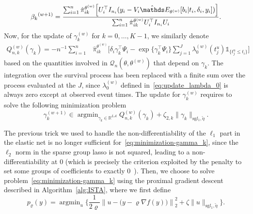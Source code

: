 \documentclass[11pt]{article}
\DeclareMathOperator{\argmin}{argmin}
\newcommand{\ind}[1]{\mathds{1}_{#1}}
\newcommand{\norm}[1]{\|#1\|}
\newcommand{\cA}{\mathcal A}
\newcommand{\cQ}{\mathcal Q}
\newcommand{\R}{\mathds R}
\newcommand{\E}{\mathds E}
\begin{document}
\begin{equation}
  \label{eq:update_beta}
  {\beta_k}^{(w+1)}= \dfrac{\sum_{i=1}^n\hat \pi_{ik}^{\theta^{(w)}} \Big[U_i^\top I_{n_i} (y_i - V_i\hat \E_{\theta^{(w)}}[ b_i | t_i, \delta_i, y_i])\Big]}{\sum_{i=1}^n \hat \pi_{ik}^{\theta^{(w)}} U_i^\top I_{n_i} U_i}.
\end{equation}
Now, for the update of $\gamma_k^{(w)}$ for $k=0, \ldots, K-1$, we similarly denote
\begin{align*}
  Q^{(w)}_{n,k}(\gamma_k) = -n^{-1} \sum_{i=1}^n &\hat\pi_{ik}^{\theta^{(w)}} \Big[\delta_i \gamma_k^\top \Psi_i -  \exp \big\{\gamma_k^\top \Psi_i\big\} \sum_{j=1}^J \lambda_0^{(w)}(t_j^u) \ind{\{t_j^u \leq t_i\}} \Big]
\end{align*}
based on the quantities involved in $\cQ_n(\theta, \theta^{(w)})$ that depend on $\gamma_k$. The integration over the survival process has been replaced with a finite sum over the process evaluated at the $J$, since $\lambda_0^{(w)}$ defined in~\eqref{eq:update_lambda_0} is always zero except at observed event times. The update for $\gamma_k^{(w)}$ requires to solve the following minimization problem
\begin{equation}
  \label{eq:minimization-gamma_k}
  \gamma_k^{(w+1)} \in \argmin_{\gamma_k \in \R^{L\cA}} Q^{(w)}_{n,k}(\gamma_k) + \zeta_{2,k} \norm{\gamma_k}_{\text{sg} l_1, \tilde{\eta}}.
\end{equation}

The previous trick we used to handle the non-differentiability of the $\ell_1$ part in the elastic net is no longer sufficient for~\eqref{eq:minimization-gamma_k}, since the $\ell_2$ norm in the sparse group lasso is not squared, leading to a non-differentiability at 0 (which is precisely the criterion exploited by the penalty to set some groups of coefficients to exactly 0~\citep{simon2013sparse}). Then, we choose to solve problem~\eqref{eq:minimization-gamma_k} using the proximal gradient descent~\citep{boyd2004convex} described in Algorithm~\ref{alg:ISTA}, where we first define
\[p_{\varrho}(y) = \argmin_u \Big\{\dfrac{1}{2\varrho} \left\lVert u - \big(y - \varrho  \nabla f(y) \big)\right\rVert_2^2 + \zeta \norm{u}_{\text{sg} l_1, \tilde{\eta}} \Big\}.\]

\vspace{.5cm}
\end{document}
